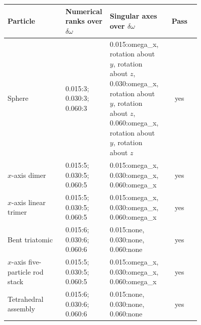\begin{tabular}{p{0.30\linewidth}p{0.23\linewidth}p{0.23\linewidth}c}
\toprule
Particle & Numerical ranks over $\delta\omega$ & Singular axes over $\delta\omega$ & Pass \\
\midrule
Sphere & 0.015:3; 0.030:3; 0.060:3 & 0.015:omega\_x, rotation about $y$, rotation about $z$, 0.030:omega\_x, rotation about $y$, rotation about $z$, 0.060:omega\_x, rotation about $y$, rotation about $z$ & yes \\
$x$-axis dimer & 0.015:5; 0.030:5; 0.060:5 & 0.015:omega\_x, 0.030:omega\_x, 0.060:omega\_x & yes \\
$x$-axis linear trimer & 0.015:5; 0.030:5; 0.060:5 & 0.015:omega\_x, 0.030:omega\_x, 0.060:omega\_x & yes \\
Bent triatomic & 0.015:6; 0.030:6; 0.060:6 & 0.015:none, 0.030:none, 0.060:none & yes \\
$x$-axis five-particle rod stack & 0.015:5; 0.030:5; 0.060:5 & 0.015:omega\_x, 0.030:omega\_x, 0.060:omega\_x & yes \\
Tetrahedral assembly & 0.015:6; 0.030:6; 0.060:6 & 0.015:none, 0.030:none, 0.060:none & yes \\
\bottomrule
\end{tabular}
